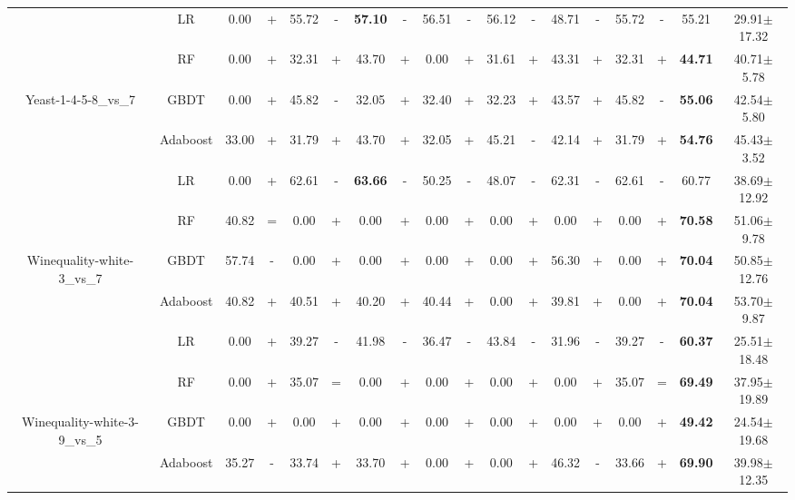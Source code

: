 \documentclass[journal]{IEEEtran}
\begin{document}
\begin{table*}
\begin{threeparttable}
\begin{tabular}{|c|c|cc|cc|cc|cc|cc|cc|cc|cc|}
			& LR    & 0.00  & +     & 55.72  & -     & \textbf{57.10}  & -     & 56.51  & -     & 56.12  & -     & 48.71  & -     & 55.72  & -     & 55.21  & 29.91$\pm$17.32  \\
			& RF    & 0.00  & +     & 32.31  & +     & 43.70  & +     & 0.00  & +     & 31.61  & +     & 43.31  & +     & 32.31  & +     & \textbf{44.71}  & 40.71$\pm$5.78  \\
			Yeast-1-4-5-8\_vs\_7
			& GBDT  & 0.00  & +     & 45.82  & -     & 32.05  & +     & 32.40  & +     & 32.23  & +     & 43.57  & +     & 45.82  & -     & \textbf{55.06}  & 42.54$\pm$5.80  \\
			& Adaboost & 33.00  & +     & 31.79  & +     & 43.70  & +     & 32.05  & +     & 45.21  & -     & 42.14  & +     & 31.79  & +     & \textbf{54.76}  & 45.43$\pm$3.52  \\
			\hline
			
			& LR    & 0.00  & +     & 62.61  & -     & \textbf{63.66}  & -     & 50.25  & -     & 48.07  & -     & 62.31  & -     & 62.61  & -     & 60.77  & 38.69$\pm$12.92  \\
			& RF    & 40.82  & =     & 0.00  & +     & 0.00  & +     & 0.00  & +     & 0.00  & +     & 0.00  & +     & 0.00  & +     & \textbf{70.58}  & 51.06$\pm$9.78  \\
			Winequality-white-3\_vs\_7
			& GBDT  & 57.74  & -     & 0.00  & +     & 0.00  & +     & 0.00  & +     & 0.00  & +     & 56.30  & +     & 0.00  & +     &\textbf{70.04} & 50.85$\pm$12.76  \\
			& Adaboost & 40.82  & +     & 40.51  & +     & 40.20  & +     & 40.44  & +     & 0.00  & +     & 39.81  & +     & 0.00  & +     & \textbf{70.04}  & 53.70$\pm$9.87  \\
			\hline
			
			& LR    & 0.00  & +     & 39.27  & -     & 41.98  & -     & 36.47  & -     & 43.84  & -     & 31.96  & -     & 39.27  & -     & \textbf{60.37}  & 25.51$\pm$18.48  \\
			& RF    & 0.00  & +     & 35.07  & =     & 0.00  & +     & 0.00  & +     & 0.00  & +     & 0.00  & +     & 35.07  & =     & \textbf{69.49}  & 37.95$\pm$19.89  \\
			Winequality-white-3-9\_vs\_5
			& GBDT  & 0.00  & +     & 0.00  & +     & 0.00  & +     & 0.00  & +     & 0.00  & +     & 0.00  & +     & 0.00  & +     & \textbf{49.42}  & 24.54$\pm$19.68  \\
			& Adaboost & 35.27  & -     & 33.74  & +     & 33.70  & +     & 0.00  & +     & 0.00  & +     & 46.32  & -     & 33.66  & +     & \textbf{69.90}  & 39.98$\pm$12.35  \\
			\hline
			

\end{tabular}
\end{threeparttable}
\end{table*}
\end{document}
